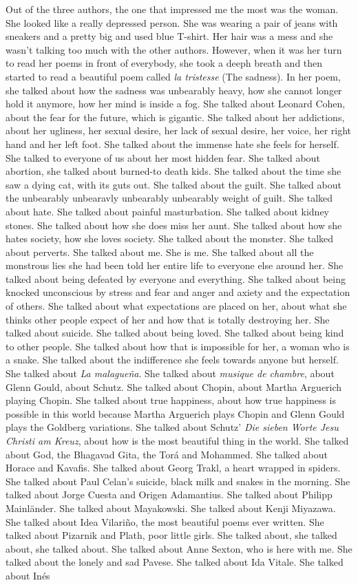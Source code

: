 \documentclass{article}
\begin{document}
Out of the three authors, the one that impressed me the most was the woman. She looked like a really depressed person. She was wearing a pair of jeans with sneakers and a pretty big and used blue T-shirt. Her hair was a mess and she wasn't talking too much with the other authors. However, when it was her turn to read her poems in front of everybody, she took a deeph breath and then started to read a beautiful poem called \textit{la tristesse} (The sadness). In her poem, she talked about how the sadness was unbearably heavy, how she cannot longer hold it anymore, how her mind is inside a fog. She talked about Leonard Cohen, about the fear for the future, which is gigantic. She talked about her addictions, about her ugliness, her sexual desire, her lack of sexual desire, her voice, her right hand and her left foot. She talked about the immense hate she feels for herself. She talked to everyone of us about her most hidden fear. She talked about abortion, she talked about burned-to death kids. She talked about the time she saw a dying cat, with its guts out. She talked about the guilt. She talked about the unbearably unbearavly unbearably unbearably weight of guilt. She talked about hate. She talked about painful masturbation. She talked about kidney stones. She talked about how she does miss her aunt. She talked about how she hates society, how she loves society. She talked about the monster. She talked about perverts. She talked about me. She is me. She talked about all the monstrous lies she had been told her entire life to everyone else around her. She talked about being defeated by everyone and everything. She talked about being knocked unconscious by stress and fear and anger and axiety and the expectation of others. She talked about what expectations are placed on her, about what she thinks other people expect of her and how that is totally destroying her. She talked about suicide. She talked about being loved. She talked about being kind to other people. She talked about how that is impossible for her, a woman who is a snake. She talked about the indifference she feels towards anyone but herself. She talked about \textit{La malagueña}. She talked about \textit{musique de chambre}, about Glenn Gould, about Schutz. She talked about Chopin, about Martha Arguerich playing Chopin. She talked about true happiness, about how true happiness is possible in this world because Martha Arguerich plays Chopin and Glenn Gould plays the Goldberg variations. She talked about Schutz' \textit{Die sieben Worte Jesu Christi am Kreuz}, about how is the most beautiful thing in the world. She talked about God, the Bhagavad Gita, the Torá and Mohammed. She talked about Horace and Kavafis. She talked about Georg Trakl, a heart wrapped in spiders. She talked about Paul Celan's suicide, black milk and snakes in the morning. She talked about Jorge Cuesta and Origen Adamantius. She talked about Philipp Mainländer. She talked about Mayakowski. She talked about Kenji Miyazawa. She talked about Idea Vilariño, the most beautiful poems ever written. She talked about Pizarnik and Plath, poor little girls. She talked about, she talked about, she talked about. She talked about Anne Sexton, who is here with me. She talked about the lonely and sad Pavese. She talked about Ida Vitale. She talked about Inés 
\end{document}
